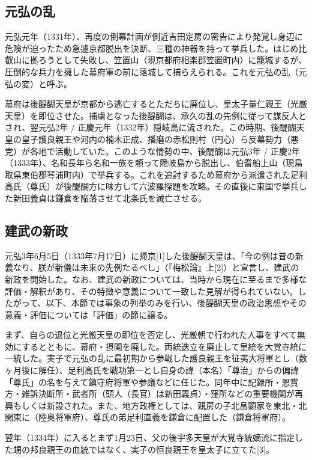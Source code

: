 \documentclass[twocolumn]{jsarticle}
\begin{document}
\subsection{元弘の乱}

元弘元年（1331年）、再度の倒幕計画が側近吉田定房の密告により発覚し身辺に危険が迫ったため急遽京都脱出を決断、三種の神器を持って挙兵した。はじめ比叡山に拠ろうとして失敗し、笠置山（現京都府相楽郡笠置町内）に籠城するが、圧倒的な兵力を擁した幕府軍の前に落城して捕らえられる。これを元弘の乱（元弘の変）と呼ぶ。

幕府は後醍醐天皇が京都から逃亡するとただちに廃位し、皇太子量仁親王（光厳天皇）を即位させた。捕虜となった後醍醐は、承久の乱の先例に従って謀反人とされ、翌元弘2年 / 正慶元年（1332年）隠岐島に流された。この時期、後醍醐天皇の皇子護良親王や河内の楠木正成、播磨の赤松則村（円心）ら反幕勢力（悪党）が各地で活動していた。このような情勢の中、後醍醐は元弘3年 / 正慶2年（1333年）、名和長年ら名和一族を頼って隠岐島から脱出し、伯耆船上山（現鳥取県東伯郡琴浦町内）で挙兵する。これを追討するため幕府から派遣された足利高氏（尊氏）が後醍醐方に味方して六波羅探題を攻略。その直後に東国で挙兵した新田義貞は鎌倉を陥落させて北条氏を滅亡させる。

\subsection{建武の新政}

元弘3年6月5日（1333年7月17日）に帰京[1]した後醍醐天皇は、「今の例は昔の新義なり、朕が新儀は未来の先例たるべし」（『梅松論』上[2]）と宣言し、建武の新政を開始した。なお、建武の新政については、当時から現在に至るまで多様な評価・解釈があり、その特徴や意義について一致した見解が得られていない。したがって、以下、本節では事象の列挙のみを行い、後醍醐天皇の政治思想やその意義・評価については「評価」の節に譲る。

まず、自らの退位と光厳天皇の即位を否定し、光厳朝で行われた人事をすべて無効にするとともに、幕府・摂関を廃した。両統迭立を廃止して皇統を大覚寺統に一統した。実子で元弘の乱に最初期から参戦した護良親王を征夷大将軍とし（数ヶ月後に解任）、足利高氏を戦功第一とし自身の諱（本名）「尊治」からの偏諱「尊氏」の名を与えて鎮守府将軍や参議などに任じた。同年中に記録所・恩賞方・雑訴決断所・武者所（頭人（長官）は新田義貞）・窪所などの重要機関が再興もしくは新設された。また、地方政権としては、親房の子北畠顕家を東北・北関東に（陸奥将軍府）、尊氏の弟足利直義を鎌倉に配置した（鎌倉将軍府）。

翌年（1334年）に入るとまず1月23日、父の後宇多天皇が大覚寺統嫡流に指定した甥の邦良親王の血統ではなく、実子の恒良親王を皇太子に立てた[3]。
\end{document}
